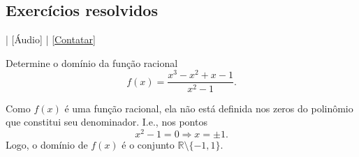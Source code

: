 \subsection*{Exercícios resolvidos}

\begin{flushright}
  [Vídeo] | [Áudio] | \href{https://phkonzen.github.io/notas/contato.html}{[Contatar]}
\end{flushright}

\begin{exer}
  Determine o domínio da função racional
  \begin{equation}
    f(x) = \frac{x^3-x^2+x-1}{x^2-1}.
  \end{equation}
\end{exer}
\begin{resol}
  Como $f(x)$ é uma função racional, ela não está definida nos zeros do polinômio que constitui seu denominador. I.e., nos pontos
  \begin{equation}
    x^2-1=0\Rightarrow x = \pm 1.
  \end{equation}
  Logo, o domínio de $f(x)$ é o conjunto $\mathbb{R}\setminus\{-1, 1\}$.
\end{resol}

